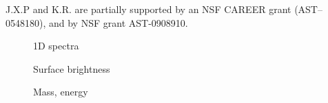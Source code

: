 \documentclass[12pt,preprint]{aastex}
\begin{document}
\acknowledgments

J.X.P and K.R. are partially supported
by an NSF CAREER grant (AST--0548180), and 
by NSF grant AST-0908910.

\clearpage

%
%



\clearpage

%

\begin{figure}
\caption{
1D spectra
}
\label{fig:1D}
\end{figure}

\begin{figure}
\caption{
Surface brightness
}
\label{fig:SB}
\end{figure}

\begin{figure}
\caption{
Mass, energy
}
\label{fig:mass_energy}
\end{figure}
\end{document}
